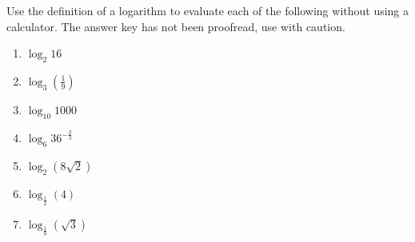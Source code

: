 Use the definition of a logarithm to evaluate each of the following without using a calculator. The answer key has not been proofread, use with caution.

\begin{enumerate}[ref={\fcProblemRef}]
\item   $\displaystyle \log_2 16$


\item   $\displaystyle\log_3 \left(\frac{1}{9}\right)$

\item   $\displaystyle\log_{10} 1000$

\item   $\displaystyle\log_{6} 36^{-\frac{2}{3}}$

\item   $\displaystyle\log_{2} (8\sqrt{2})$

\item   $\displaystyle\log_{\frac{1}{2}} (4)$

\item   $\displaystyle\log_{\frac{1}{9}} (\sqrt{3})$

\end{enumerate}
